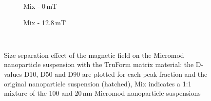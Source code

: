 \begin{figure}
          \begin{subfigure}{0.49\textwidth}
                  \flushleft
                  \caption{Mix - 0\,mT}\label{subfig:mix_0mT}
          \end{subfigure}\hfill
        \begin{subfigure}{0.49\textwidth}
                \flushright
                \caption{Mix - 12.8\,mT}\label{subfig:mix_128mT}
        \end{subfigure}
        \\        
        \caption[Size separation effect of the magnetic field on the Micromod nanoparticle suspension]{Size separation effect of the magnetic field on the Micromod nanoparticle suspension with the TruForm matrix material: the D-values D10, D50 and D90 are plotted for each peak fraction and the original nanoparticle suspension (hatched), Mix indicates a 1:1 mixture of the 100 and 20\,nm Micromod nanoparticle suspensions}
        \label{fig:micromod_partPGV_values}
  \end{figure}
  
